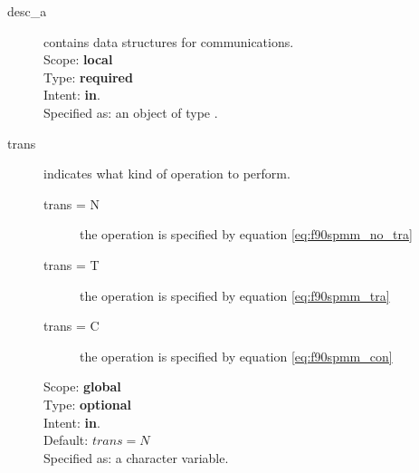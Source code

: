 \begin{description}
\item[desc\_a] contains data structures for communications.\\
Scope: {\bf local} \\
Type: {\bf required}\\
Intent: {\bf in}.\\
Specified as: an object of type \descdata.
\item[trans] indicates what kind of operation to perform.
\begin{description}
\item[trans = N] the operation is specified by equation \ref{eq:f90spmm_no_tra}
\item[trans = T] the operation is specified by equation
\ref{eq:f90spmm_tra}
\item[trans = C] the operation is specified by equation
\ref{eq:f90spmm_con}
\end{description}
Scope: {\bf global} \\
Type: {\bf optional}\\
Intent: {\bf in}.\\
Default: $trans = N$\\
Specified as: a character variable.


\end{description}
